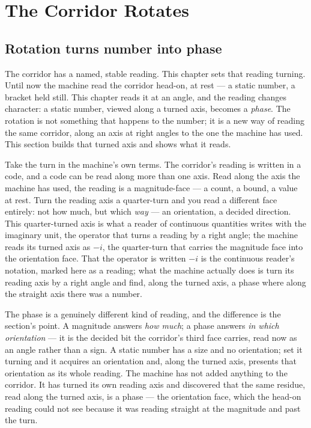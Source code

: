 \chapter{The Corridor Rotates}

\section{Rotation turns number into phase}

The corridor has a named, stable reading. This chapter sets that reading turning. Until now the machine read the corridor
head-on, at rest --- a static number, a bracket held still. This chapter reads it at an angle, and the reading changes
character: a static number, viewed along a turned axis, becomes a \emph{phase}. The rotation is not something that
happens to the number; it is a new way of reading the same corridor, along an axis at right angles to the one the machine
has used. This section builds that turned axis and shows what it reads.

Take the turn in the machine's own terms. The corridor's reading is written in a code, and a code can be read along more
than one axis. Read along the axis the machine has used, the reading is a magnitude-face --- a count, a bound, a value at
rest. Turn the reading axis a quarter-turn and you read a different face entirely: not how much, but which \emph{way} ---
an orientation, a decided direction. This quarter-turned axis is what a reader of continuous quantities writes with the
imaginary unit, the operator that turns a reading by a right angle; the machine reads its turned axis as $-i$, the
quarter-turn that carries the magnitude face into the orientation face. That the operator is written $-i$ is the
continuous reader's notation, marked here as a reading; what the machine actually does is turn its reading axis by a
right angle and find, along the turned axis, a phase where along the straight axis there was a number.

The phase is a genuinely different kind of reading, and the difference is the section's point. A magnitude answers
\emph{how much}; a phase answers \emph{in which orientation} --- it is the decided bit the corridor's third face carries,
read now as an angle rather than a sign. A static number has a size and no orientation; set it turning and it acquires an
orientation and, along the turned axis, presents that orientation as its whole reading. The machine has not added
anything to the corridor. It has turned its own reading axis and discovered that the same residue, read along the turned
axis, is a phase --- the orientation face, which the head-on reading could not see because it was reading straight at the
magnitude and past the turn.

